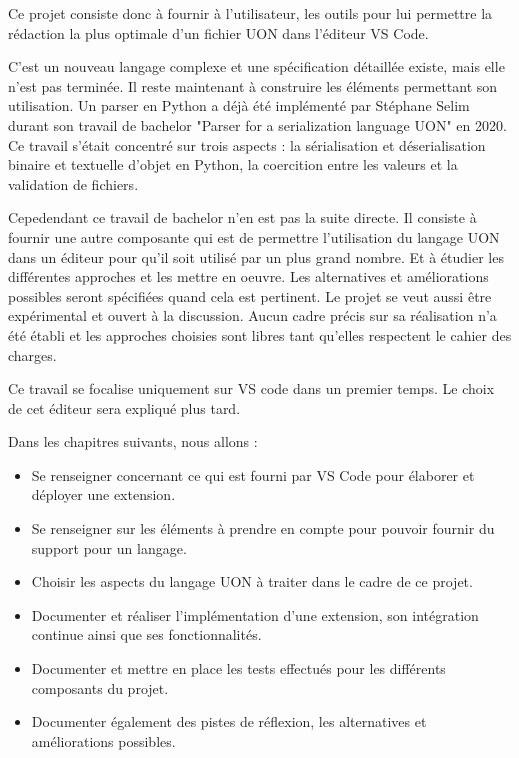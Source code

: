 \documentclass[
    iict, %
    il, %
]{heig-tb}
\begin{document}
Ce projet consiste donc à fournir à l'utilisateur, les outils pour lui permettre la rédaction la plus optimale d'un fichier UON dans l'éditeur VS Code.

C'est un nouveau langage complexe et une spécification détaillée existe, mais elle n'est pas terminée. Il reste maintenant à construire les éléments permettant son utilisation.
Un parser en Python a déjà été implémenté par Stéphane Selim durant son travail de bachelor "Parser for a serialization language UON" en 2020.
Ce travail s'était concentré sur trois aspects : la sérialisation et déserialisation binaire et textuelle d'objet en Python, la coercition entre les valeurs et la validation de fichiers.

Cepedendant ce travail de bachelor n'en est pas la suite directe.
Il consiste à fournir une autre composante qui est de permettre l'utilisation du langage UON dans un éditeur pour qu'il soit utilisé par un plus grand nombre.
Et à étudier les différentes approches et les mettre en oeuvre.
Les alternatives et améliorations possibles seront spécifiées quand cela est pertinent.
Le projet se veut aussi être expérimental et ouvert à la discussion.
Aucun cadre précis sur sa réalisation n'a été établi et les approches choisies sont libres tant qu'elles respectent le cahier des charges.

Ce travail se focalise uniquement sur VS code dans un premier temps. Le choix de cet éditeur sera expliqué plus tard.

Dans les chapitres suivants, nous allons :

\begin{itemize}
    \item Se renseigner concernant ce qui est fourni par VS Code pour élaborer et déployer une extension.
    \item Se renseigner sur les éléments à prendre en compte pour pouvoir fournir du support pour un langage.
    \item Choisir les aspects du langage UON à traiter dans le cadre de ce projet.
    \item Documenter et réaliser l'implémentation d'une extension, son intégration continue ainsi que ses fonctionnalités.
    \item Documenter et mettre en place les tests effectués pour les différents composants du projet.
    \item Documenter également des pistes de réflexion, les alternatives et améliorations possibles.
\end{itemize}
\end{document}
